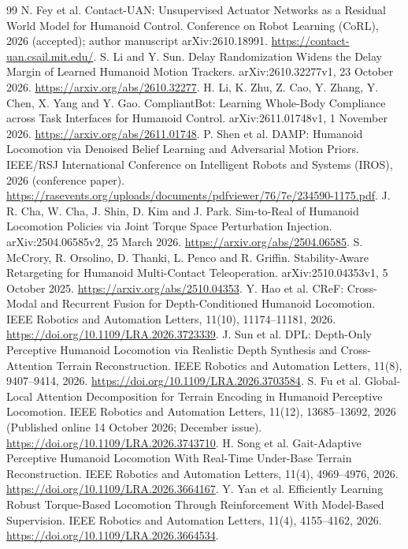 \documentclass[11pt,a4paper]{article}
\begin{document}
\begin{thebibliography}{99}
 N. Fey et al. Contact-UAN: Unsupervised Actuator Networks as a Residual World Model for Humanoid Control. Conference on Robot Learning (CoRL), 2026 (accepted); author manuscript arXiv:2610.18991. \url{https://contact-uan.csail.mit.edu/}.
 S. Li and Y. Sun. Delay Randomization Widens the Delay Margin of Learned Humanoid Motion Trackers. arXiv:2610.32277v1, 23 October 2026. \url{https://arxiv.org/abs/2610.32277}.
 H. Li, K. Zhu, Z. Cao, Y. Zhang, Y. Chen, X. Yang and Y. Gao. CompliantBot: Learning Whole-Body Compliance across Task Interfaces for Humanoid Control. arXiv:2611.01748v1, 1 November 2026. \url{https://arxiv.org/abs/2611.01748}.
 P. Shen et al. DAMP: Humanoid Locomotion via Denoised Belief Learning and Adversarial Motion Priors. IEEE/RSJ International Conference on Intelligent Robots and Systems (IROS), 2026 (conference paper). \url{https://rasevents.org/uploads/documents/pdfviewer/76/7e/234590-1175.pdf}.
 J. R. Cha, W. Cha, J. Shin, D. Kim and J. Park. Sim-to-Real of Humanoid Locomotion Policies via Joint Torque Space Perturbation Injection. arXiv:2504.06585v2, 25 March 2026. \url{https://arxiv.org/abs/2504.06585}.
 S. McCrory, R. Orsolino, D. Thanki, L. Penco and R. Griffin. Stability-Aware Retargeting for Humanoid Multi-Contact Teleoperation. arXiv:2510.04353v1, 5 October 2025. \url{https://arxiv.org/abs/2510.04353}.
 Y. Hao et al. CReF: Cross-Modal and Recurrent Fusion for Depth-Conditioned Humanoid Locomotion. IEEE Robotics and Automation Letters, 11(10), 11174--11181, 2026. \url{https://doi.org/10.1109/LRA.2026.3723339}.
 J. Sun et al. DPL: Depth-Only Perceptive Humanoid Locomotion via Realistic Depth Synthesis and Cross-Attention Terrain Reconstruction. IEEE Robotics and Automation Letters, 11(8), 9407--9414, 2026. \url{https://doi.org/10.1109/LRA.2026.3703584}.
 S. Fu et al. Global-Local Attention Decomposition for Terrain Encoding in Humanoid Perceptive Locomotion. IEEE Robotics and Automation Letters, 11(12), 13685--13692, 2026 (Published online 14 October 2026; December issue). \url{https://doi.org/10.1109/LRA.2026.3743710}.
 H. Song et al. Gait-Adaptive Perceptive Humanoid Locomotion With Real-Time Under-Base Terrain Reconstruction. IEEE Robotics and Automation Letters, 11(4), 4969--4976, 2026. \url{https://doi.org/10.1109/LRA.2026.3664167}.
 Y. Yan et al. Efficiently Learning Robust Torque-Based Locomotion Through Reinforcement With Model-Based Supervision. IEEE Robotics and Automation Letters, 11(4), 4155--4162, 2026. \url{https://doi.org/10.1109/LRA.2026.3664534}.

\end{thebibliography}
\end{document}
